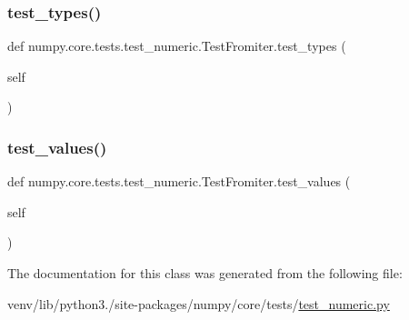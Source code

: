 \subsubsection{\texorpdfstring{test\+\_\+types()}{test\_types()}}
{\footnotesize\ttfamily def numpy.\+core.\+tests.\+test\+\_\+numeric.\+Test\+Fromiter.\+test\+\_\+types (\begin{DoxyParamCaption}\item[{}]{self }\end{DoxyParamCaption})}

\mbox{\label{classnumpy_1_1core_1_1tests_1_1test__numeric_1_1TestFromiter_a1d67db4e105d36ee26c01e764d3518fb}} 
\subsubsection{\texorpdfstring{test\+\_\+values()}{test\_values()}}
{\footnotesize\ttfamily def numpy.\+core.\+tests.\+test\+\_\+numeric.\+Test\+Fromiter.\+test\+\_\+values (\begin{DoxyParamCaption}\item[{}]{self }\end{DoxyParamCaption})}



The documentation for this class was generated from the following file\+:\begin{DoxyCompactItemize}
\item 
venv/lib/python3./site-\/packages/numpy/core/tests/\hyperlink{core_2tests_2test__numeric_8py}{test\+\_\+numeric.\+py}\end{DoxyCompactItemize}
